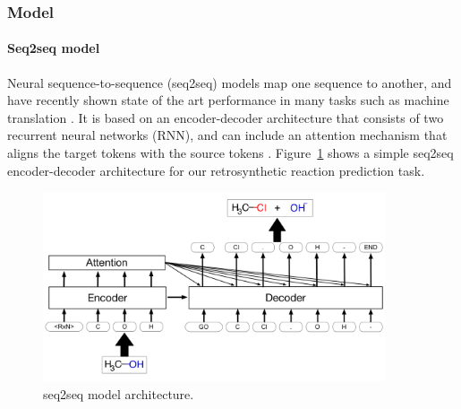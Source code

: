 \subsubsection{Model}

\paragraph{Seq2seq model}

Neural sequence-to-sequence (seq2seq) models map one sequence to another, and have recently shown state of the art performance in many tasks such as machine translation \cite{bahdanau2014neural, sutskever2014sequence}. It is based on an encoder-decoder architecture that consists of two recurrent neural networks (RNN), and can include an attention mechanism that aligns the target tokens with the source tokens \cite{bahdanau2014neural}. Figure~\ref{fig:ret_seq2seq} shows a simple seq2seq encoder-decoder architecture for our retrosynthetic reaction prediction task.

\begin{figure}
  \centering
  \includegraphics[width=0.9\textwidth]{Images/ret_seq2seq.png}
  \caption{seq2seq model architecture.}
  \label{fig:ret_seq2seq}
\end{figure}

